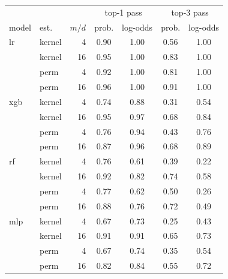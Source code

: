 \begin{tabular}{llr|cc|cc}
\toprule
& & & \multicolumn{2}{c|}{top-1 pass} & \multicolumn{2}{c}{top-3 pass}\\
model & est. & $m/d$ & prob. & log-odds & prob. & log-odds\\
\midrule
lr & kernel & 4 & 0.90 & 1.00 & 0.56 & 1.00\\
 & kernel & 16 & 0.95 & 1.00 & 0.83 & 1.00\\
 & perm & 4 & 0.92 & 1.00 & 0.81 & 1.00\\
 & perm & 16 & 0.96 & 1.00 & 0.91 & 1.00\\
\midrule
xgb & kernel & 4 & 0.74 & 0.88 & 0.31 & 0.54\\
 & kernel & 16 & 0.95 & 0.97 & 0.68 & 0.84\\
 & perm & 4 & 0.76 & 0.94 & 0.43 & 0.76\\
 & perm & 16 & 0.87 & 0.96 & 0.68 & 0.89\\
\midrule
rf & kernel & 4 & 0.76 & 0.61 & 0.39 & 0.22\\
 & kernel & 16 & 0.92 & 0.82 & 0.74 & 0.58\\
 & perm & 4 & 0.77 & 0.62 & 0.50 & 0.26\\
 & perm & 16 & 0.88 & 0.76 & 0.72 & 0.49\\
\midrule
mlp & kernel & 4 & 0.67 & 0.73 & 0.25 & 0.43\\
 & kernel & 16 & 0.91 & 0.91 & 0.65 & 0.73\\
 & perm & 4 & 0.67 & 0.74 & 0.35 & 0.54\\
 & perm & 16 & 0.82 & 0.84 & 0.55 & 0.72\\
\bottomrule
\end{tabular}
